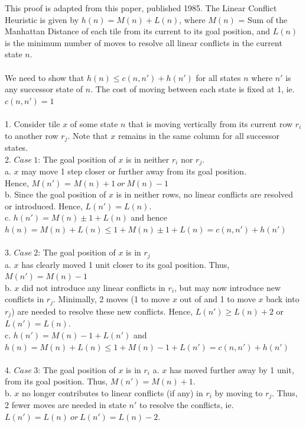 \documentclass[runningheads]{llncs}
\begin{document}
This proof is adapted from this paper, published 1985. The Linear Conflict Heuristic
is given by ${h(n) = M(n) + L(n)}$, where $M(n)$ = Sum of the Manhattan Distance of each tile from its current to its goal position, and $L(n)$ is the minimum number of moves to resolve all linear conflicts in the current state $n$. \\
\\
We need to show that $h(n) \leq c(n,n') + h(n')$ for all states $n$ where $n'$ is any successor state of $n$. The cost of moving between each state is fixed at 1, ie. $c(n, n') = 1$ \\
\\
1. Consider tile $x$ of some state $n$ that is moving vertically from its current row $r_i$ to another row $r_j$. Note that $x$ remains in the same column for all successor states.\\
2. ${Case \ 1}$:   The goal position of $x$ is in neither $r_i$ nor $r_j$.\\
\indent a. $x$ may move 1 step closer or further away from its goal position.\\ Hence, $M(n')$ = ${M(n) + 1 \ or \ M(n) - 1}$ \\
\indent b.  Since the goal position of $x$ is in neither rows, no linear conflicts are resolved or introduced. Hence, $L(n') = L(n)$.\\
\indent c. ${h(n') =  M(n) \pm 1 + L(n)}$ and hence $h(n) = M(n) + L(n) \leq 1 + M(n) \pm 1 + L(n) = c(n, n') + h(n')$\\
\\
3. ${Case \ 2}$: The goal position of $x$ is in $r_j$\\
\indent a. $x$ has clearly moved 1 unit closer to its goal position. Thus, $M(n') = M(n) - 1$\\
\indent b. $x$ did not introduce any linear conflicts in $r_i$, but may now introduce new conflicts in $r_j$. Minimally, 2 moves (1 to move $x$ out of and 1 to move $x$ back into $r_j$) are needed to resolve these new conflicts. Hence, $L(n') \geq L(n) + 2$ or $L(n') = L(n)$.\\
\indent c. $h(n') = M(n) - 1 + L(n')$ and $h(n) = M(n) + L(n) \leq 1 + M(n) - 1 + L(n') = c(n, n') + h(n')$\\
\\
4. $Case \ 3$: The goal position of $x$ is in $r_i$
\indent a. $x$ has moved further away by 1 unit, from its goal position. Thus, $M(n') = M(n) + 1$.\\
\indent b. $x$ no longer contributes to linear conflicts (if any) in $r_i$ by moving to $r_j$. Thus, 2 fewer moves are needed in state $n'$ to resolve the conflicts, ie. $L(n') = L(n) \  or\  L(n') = L(n) - 2$.\\ 
\end{document}
